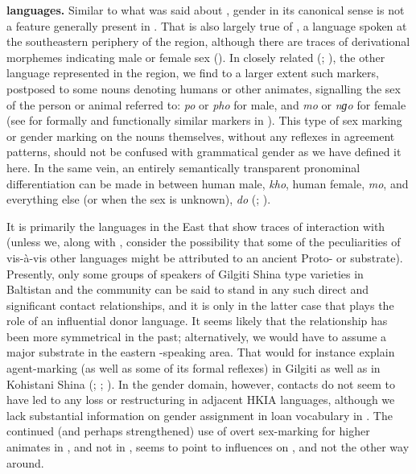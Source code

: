 \documentclass[output=collectionpaper]{langsci/langscibook}
\begin{document}
\textbf{ languages.} Similar to what was said about , gender in its canonical sense is not a feature generally present in . That is also largely true of , a  language spoken at the southeastern periphery of the region, although there are traces of derivational morphemes indicating male or female sex (\citealt[118--127]{Zemp2013}). In closely related  (\citealt[81]{Bielmeier1985}; \citealt[4]{Read1934}), the other  language represented in the region, we find to a larger extent such markers, postposed to some nouns denoting humans or other animates, signalling the sex of the person or animal referred to: \textit{po} or \textit{pho} for male, and \textit{mo} or \textit{nɡ}\textit{o} for female (see  for formally and functionally similar markers in ). This type of sex marking or gender marking on the nouns themselves, without any reflexes in agreement patterns, should not be confused with grammatical gender as we have defined it here. In the same vein, an entirely semantically transparent pronominal differentiation can be made in  between human male, \textit{kho}, human female, \textit{mo}, and everything else (or when the sex is unknown), \textit{do} (\citealt[12--13]{Read1934}; \citealt[76]{Bielmeier1985}).

It is primarily the  languages in the East that show traces of interaction with  (unless we, along with \citealt[305]{Tikkanen1988}, consider the possibility that some of the peculiarities of  vis-à-vis other  languages might be attributed to an ancient Proto- or  substrate). Presently, only some groups of speakers of Gilgiti Shina type varieties in Baltistan and the  community can be said to stand in any such direct and significant contact relationships, and it is only in the latter case that  plays the role of an influential donor language. It seems likely that the relationship has been more symmetrical in the past; alternatively, we would have to assume a major  substrate in the eastern -speaking area. That would for instance explain agent-marking (as well as some of its formal reflexes) in Gilgiti as well as in Kohistani Shina (\citealt[162--163]{Liljegren2014}; \citealt[211]{Bailey1924}; \citealt[213--214]{Hook2004}). In the gender domain, however,  contacts do not seem to have led to any loss or restructuring in adjacent HKIA languages, although we lack substantial information on gender assignment in  loan vocabulary in . The continued (and perhaps strengthened) use of overt sex-marking for higher animates in , and not in , seems to point to  influences on , and not the other way around.
\end{document}
